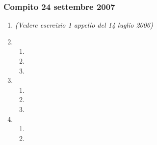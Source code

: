 \documentclass{article}
\begin{document}
\subsubsection{Compito 24 settembre 2007}
\begin{enumerate}

    \item \emph{(Vedere esercizio 1 appello del 14 luglio 2006)}
    
    \item\begin{enumerate}[label=\alph*)]
        \item
        \item
        \item
    \end{enumerate}
    
    \item\begin{enumerate}[label=\alph*)]
        \item
        \item
        \item
    \end{enumerate}
    
    \item 
    \begin{enumerate}[label=\alph*)]
    		\item
    		\item
    \end{enumerate}
\end{enumerate}

\newpage
\end{document}
